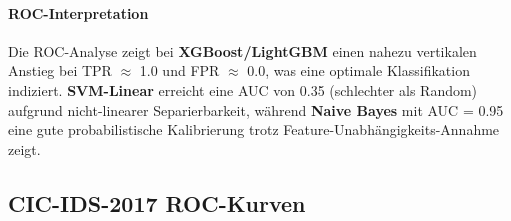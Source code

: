 \documentclass[11pt,a4paper]{article}
\begin{document}
    \paragraph{ROC-Interpretation}
    Die ROC-Analyse zeigt bei \textbf{XGBoost/LightGBM} einen nahezu vertikalen Anstieg bei TPR $\approx$ 1.0 und FPR $\approx$ 0.0, was eine optimale Klassifikation indiziert. \textbf{SVM-Linear} erreicht eine AUC von 0.35 (schlechter als Random) aufgrund nicht-linearer Separierbarkeit, während \textbf{Naive Bayes} mit AUC = 0.95 eine gute probabilistische Kalibrierung trotz Feature-Unabhängigkeits-Annahme zeigt.

    \subsection{CIC-IDS-2017 ROC-Kurven}
    \label{app:cic_roc}
\end{document}
